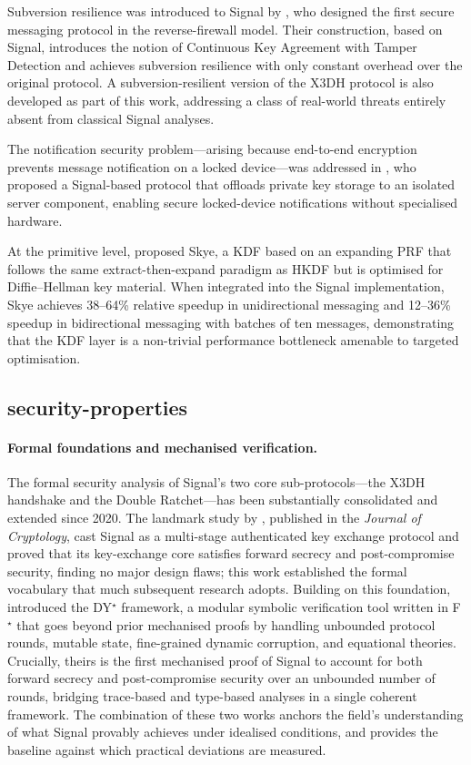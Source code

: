 Subversion resilience was introduced to Signal by \textcite{dodis2025}, who designed the first secure messaging protocol in the reverse-firewall model. Their construction, based on Signal, introduces the notion of Continuous Key Agreement with Tamper Detection and achieves subversion resilience with only constant overhead over the original protocol. A subversion-resilient version of the X3DH protocol is also developed as part of this work, addressing a class of real-world threats entirely absent from classical Signal analyses.

The notification security problem—arising because end-to-end encryption prevents message notification on a locked device—was addressed in \textcite{almari2024}, who proposed a Signal-based protocol that offloads private key storage to an isolated server component, enabling secure locked-device notifications without specialised hardware.

At the primitive level, \textcite{bhati2024} proposed Skye, a KDF based on an expanding PRF that follows the same extract-then-expand paradigm as HKDF but is optimised for Diffie--Hellman key material. When integrated into the Signal implementation, Skye achieves 38--64\% relative speedup in unidirectional messaging and 12--36\% speedup in bidirectional messaging with batches of ten messages, demonstrating that the KDF layer is a non-trivial performance bottleneck amenable to targeted optimisation.

\subsection{security-properties}

\paragraph{Formal foundations and mechanised verification.}
The formal security analysis of Signal's two core sub-protocols—the X3DH handshake and the Double Ratchet—has been substantially consolidated and extended since 2020. The landmark study by \textcite{cohn-gordon2020}, published in the \emph{Journal of Cryptology}, cast Signal as a multi-stage authenticated key exchange protocol and proved that its key-exchange core satisfies forward secrecy and post-compromise security, finding no major design flaws; this work established the formal vocabulary that much subsequent research adopts. Building on this foundation, \textcite{bhargavan2021} introduced the DY$^\star$ framework, a modular symbolic verification tool written in F$^\star$ that goes beyond prior mechanised proofs by handling unbounded protocol rounds, mutable state, fine-grained dynamic corruption, and equational theories. Crucially, theirs is the first mechanised proof of Signal to account for both forward secrecy and post-compromise security over an unbounded number of rounds, bridging trace-based and type-based analyses in a single coherent framework. The combination of these two works anchors the field's understanding of what Signal provably achieves under idealised conditions, and provides the baseline against which practical deviations are measured.

